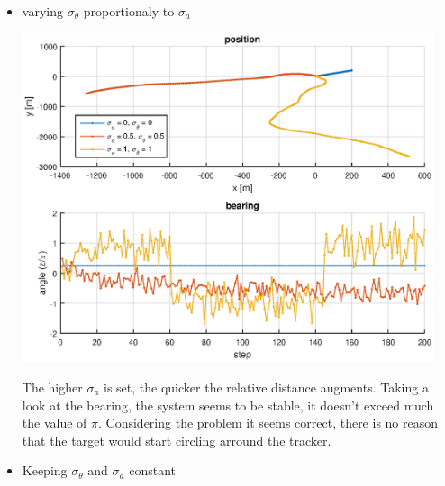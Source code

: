 \documentclass[english,DIV=13]{scrartcl}
\begin{document}
\begin{itemize}
\begin{center}
\end{center}
\item varying $\sigma_\theta$ proportionaly to $\sigma_a$
\begin{center}
	\begin{minipage}{.5\textwidth}
   		\includegraphics[width=0.95\textwidth]{img/q2_4.eps}
	\end{minipage}%
	\begin{minipage}{.5\textwidth}
		The higher $\sigma_a$ is set, the quicker the relative distance augments. Taking a look at the bearing,
		the system seems to be stable, it doesn't exceed much the value of $\pi$. Considering the problem
		it seems correct, there is no reason that the target would start circling arround the tracker. 
	\end{minipage}
\end{center}
\item  Keeping $\sigma_\theta$ and $\sigma_a$ constant


\end{itemize}
\end{document}
